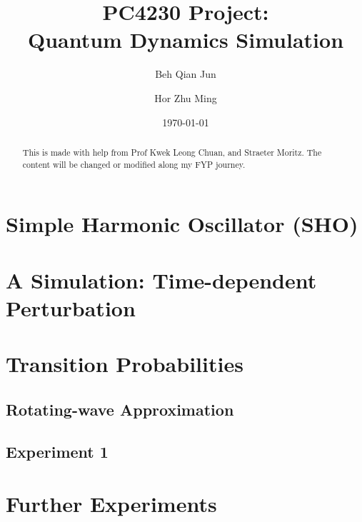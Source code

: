 \documentclass[%
 reprint,
 amsmath,amssymb,
 aps,
]{revtex4-2}
\begin{document}
\title{PC4230 Project: \\Quantum Dynamics Simulation}%
\author{Beh Qian Jun}
\author{Hor Zhu Ming}
\date{\today}
\begin{abstract}
    This is made with help from Prof Kwek Leong Chuan, and Straeter Moritz. 
    The content will be changed or modified along my FYP journey.
\end{abstract}
\maketitle %

\section{Simple Harmonic Oscillator (SHO)}
\section{A Simulation: Time-dependent Perturbation}
\section{Transition Probabilities}
\subsection{Rotating-wave Approximation}
\subsection{Experiment 1}
\section{Further Experiments}


\end{document}
